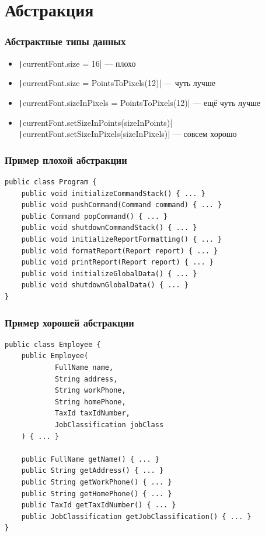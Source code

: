 \documentclass{../../slides-style}
\begin{document}
    \begin{frame}[plain]
        \titlepage
    \end{frame}

    \section{Абстракция}

    \begin{frame}
        \frametitle{Абстрактные типы данных}
        \begin{itemize}
            \item \texttt|currentFont.size = 16| --- плохо
            \item \texttt|currentFont.size = PointsToPixels(12)| --- чуть лучше
            \item \texttt|currentFont.sizeInPixels = PointsToPixels(12)| --- ещё чуть лучше
            \item \texttt|currentFont.setSizeInPoints(sizeInPoints)| \newline
                    \texttt|currentFont.setSizeInPixels(sizeInPixels)| --- совсем хорошо
        \end{itemize}
    \end{frame}

    \begin{frame}[fragile]
        \frametitle{Пример плохой абстракции}
        \begin{verbatim}
public class Program {
    public void initializeCommandStack() { ... }
    public void pushCommand(Command command) { ... }
    public Command popCommand() { ... }
    public void shutdownCommandStack() { ... }
    public void initializeReportFormatting() { ... }
    public void formatReport(Report report) { ... }
    public void printReport(Report report) { ... }
    public void initializeGlobalData() { ... }
    public void shutdownGlobalData() { ... }
}
        \end{verbatim}
    \end{frame}

    \begin{frame}[fragile]
        \frametitle{Пример хорошей абстракции}
        \begin{footnotesize}
            \begin{verbatim}
public class Employee {
    public Employee(
            FullName name,
            String address,
            String workPhone,
            String homePhone,
            TaxId taxIdNumber,
            JobClassification jobClass
    ) { ... }

    public FullName getName() { ... }
    public String getAddress() { ... }
    public String getWorkPhone() { ... }
    public String getHomePhone() { ... }
    public TaxId getTaxIdNumber() { ... }
    public JobClassification getJobClassification() { ... }
}
            \end{verbatim}
        \end{footnotesize}
    \end{frame}
\end{document}
